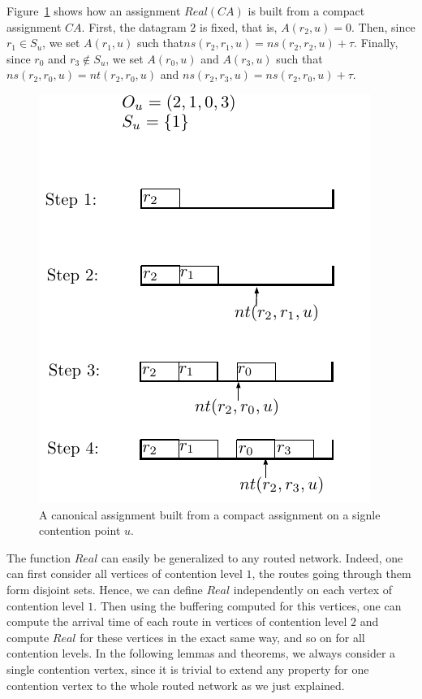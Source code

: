 \documentclass[english]{article}
\begin{document}
Figure~\ref{fig:compacttoassignment} shows how an assignment $Real(CA)$ is built from a compact assignment $CA$. First, the datagram $2$ is fixed, that is, $A(r_2,u)=0$. Then, since $r_1 \in S_u$, we set $A(r_1,u)$ such that$ ns(r_2,r_1,u) = ns(r_2,r_2,u) + \tau$. Finally, since $r_0$ and $r_3 \notin S_u$, we set $A(r_0,u)$ and $A(r_3,u)$ such that $ns(r_2,r_0,u) = nt(r_2,r_0,u)$ and  $ns(r_2,r_3,u) = ns(r_2,r_0,u) + \tau$.
\begin{figure}[!h]
	\centering
	\includegraphics[scale=1]{compacttoassignment}
\caption{A canonical assignment built from a compact assignment on a signle contention point $u$. }
\label{fig:compacttoassignment}
\end{figure}

The function $Real$ can easily be generalized to any routed network. Indeed, one can first consider all vertices of contention level $1$, the routes going through them form disjoint sets. Hence, we can define $Real$ independently on each vertex of contention level $1$. 
Then using the buffering computed for this vertices, one can compute the arrival time of each route in vertices of contention level $2$ and compute $Real$ for these vertices in the exact same way, and so on for all contention levels. In the following lemmas and theorems, we always consider a single contention vertex, since it is trivial to extend any property for one contention vertex to the whole routed network as we just explained. 
\end{document}
